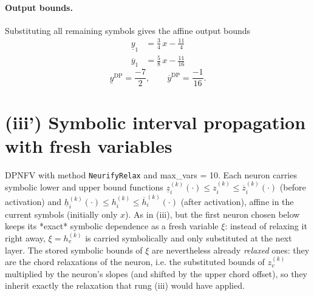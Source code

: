 \documentclass[11pt]{article}
\begin{document}
\paragraph{Output bounds.}
Substituting all remaining symbols gives the affine output bounds
\begin{align*}
\underline{y}_{1} &= \frac{3}{4}\,x - \frac{11}{4}
\end{align*}
\begin{align*}
\overline{y}_{1} &= \frac{5}{8}\,x - \frac{11}{16}
\end{align*}
\begin{equation*}
\underline{y}^{\text{DP}} = \frac{-7}{2}, \qquad \overline{y}^{\text{DP}} = \frac{-1}{16}.
\end{equation*}

\section{(iii') Symbolic interval propagation with fresh variables}
DPNFV with method \texttt{NeurifyRelax} and max\_vars = 10. Each neuron carries symbolic lower and upper bound functions
$\underline{z}^{(k)}_i(\cdot) \le z^{(k)}_i \le \overline{z}^{(k)}_i(\cdot)$ (before activation)
and $\underline{h}^{(k)}_i(\cdot) \le h^{(k)}_i \le \overline{h}^{(k)}_i(\cdot)$ (after activation),
affine in the current symbols (initially only $x$).
As in (iii), but the first neuron chosen below keeps its *exact*
symbolic dependence as a fresh variable $\xi$: instead of relaxing it right away, $\xi = h^{(k)}_v$
is carried symbolically and only substituted at the next layer. The stored symbolic bounds of $\xi$
are nevertheless already \emph{relaxed} ones: they are the chord relaxations of the neuron, i.e.
the substituted bounds of $z^{(k)}_v$ multiplied by the neuron's slopes (and shifted by the upper
chord offset), so they inherit exactly the relaxation that rung (iii) would have applied.
\end{document}
